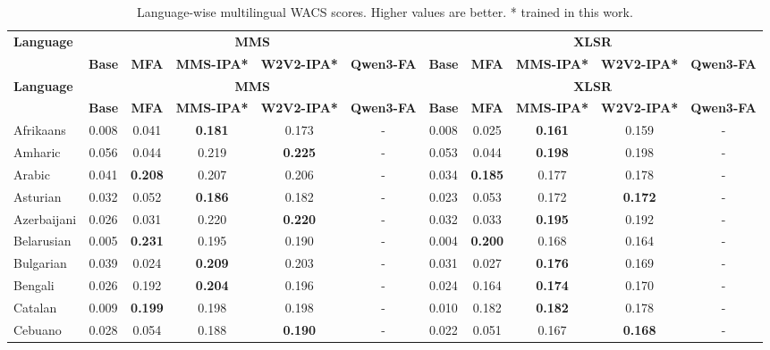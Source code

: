 \begingroup
\scriptsize
\setlength{\tabcolsep}{3pt}
\renewcommand{\arraystretch}{0.92}
\begin{longtable}{lcccccccccc}
\caption{Language-wise multilingual WACS scores. Higher values are better. * trained in this work.}\label{tab:wacs_table}\\
\toprule
\multirow{2}{*}{\textbf{Language}} & \multicolumn{5}{c}{\textbf{MMS}} & \multicolumn{5}{c}{\textbf{XLSR}} \\
\cmidrule(lr){2-6}\cmidrule(lr){7-11}
& \textbf{Base}& \textbf{MFA}& \textbf{MMS-IPA*}& \textbf{W2V2-IPA*}& \textbf{Qwen3-FA}& \textbf{Base}& \textbf{MFA}& \textbf{MMS-IPA*}& \textbf{W2V2-IPA*}& \textbf{Qwen3-FA}\\
\midrule
\endfirsthead
\toprule
\multirow{2}{*}{\textbf{Language}} & \multicolumn{5}{c}{\textbf{MMS}} & \multicolumn{5}{c}{\textbf{XLSR}} \\
\cmidrule(lr){2-6}\cmidrule(lr){7-11}
& \textbf{Base}& \textbf{MFA}& \textbf{MMS-IPA*}& \textbf{W2V2-IPA*}& \textbf{Qwen3-FA}& \textbf{Base}& \textbf{MFA}& \textbf{MMS-IPA*}& \textbf{W2V2-IPA*}& \textbf{Qwen3-FA}\\
\midrule
\endhead
\bottomrule
\endfoot
Afrikaans & 0.008 & 0.041 & \textbf{0.181} & 0.173 & - & 0.008 & 0.025 & \textbf{0.161} & 0.159 & - \\
Amharic & 0.056 & 0.044 & 0.219 & \textbf{0.225} & - & 0.053 & 0.044 & \textbf{0.198} & 0.198 & - \\
Arabic & 0.041 & \textbf{0.208} & 0.207 & 0.206 & - & 0.034 & \textbf{0.185} & 0.177 & 0.178 & - \\
Asturian & 0.032 & 0.052 & \textbf{0.186} & 0.182 & - & 0.023 & 0.053 & 0.172 & \textbf{0.172} & - \\
Azerbaijani & 0.026 & 0.031 & 0.220 & \textbf{0.220} & - & 0.032 & 0.033 & \textbf{0.195} & 0.192 & - \\
Belarusian & 0.005 & \textbf{0.231} & 0.195 & 0.190 & - & 0.004 & \textbf{0.200} & 0.168 & 0.164 & - \\
Bulgarian & 0.039 & 0.024 & \textbf{0.209} & 0.203 & - & 0.031 & 0.027 & \textbf{0.176} & 0.169 & - \\
Bengali & 0.026 & 0.192 & \textbf{0.204} & 0.196 & - & 0.024 & 0.164 & \textbf{0.174} & 0.170 & - \\
Catalan & 0.009 & \textbf{0.199} & 0.198 & 0.198 & - & 0.010 & 0.182 & \textbf{0.182} & 0.178 & - \\
Cebuano & 0.028 & 0.054 & 0.188 & \textbf{0.190} & - & 0.022 & 0.051 & 0.167 & \textbf{0.168} & - \\

\end{longtable}
